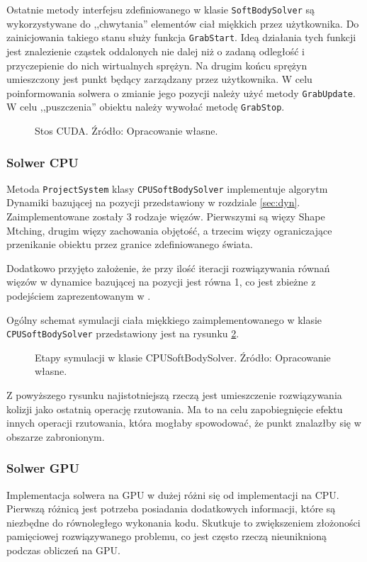 {Ostatnie metody interfejsu zdefiniowanego w klasie \texttt{SoftBodySolver}
są wykorzystywane do ,,chwytania'' elementów ciał miękkich przez użytkownika. Do
zainicjowania takiego stanu służy funkcja \texttt{GrabStart}. Ideą działania
tych funkcji jest znalezienie cząstek oddalonych nie dalej niż o zadaną
odległość i przyczepienie do nich wirtualnych sprężyn. Na drugim końcu sprężyn
umieszczony jest punkt będący zarządzany przez użytkownika. W celu
poinformowania solwera o zmianie jego pozycji należy użyć metody
\texttt{GrabUpdate}. W celu ,,puszczenia'' obiektu należy wywołać metodę
\texttt{GrabStop}.


\begin{figure}[H]
\centering

\caption{Stos CUDA. Źródło: Opracowanie własne.}
\label{class-hierarchy}
\end{figure}

\subsubsection{Solwer CPU}
Metoda \texttt{ProjectSystem} klasy \texttt{CPUSoftBodySolver}
implementuje algorytm Dynamiki bazującej na pozycji przedstawiony w rozdziale
\ref{sec:dyn}. Zaimplementowane zostały 3 rodzaje więzów. Pierwszymi są więzy Shape
Mtching, drugim więzy zachowania objętość, a trzecim więzy ograniczające
przenikanie obiektu przez granice zdefiniowanego świata.

Dodatkowo przyjęto założenie, że przy ilość iteracji rozwiązywania równań więzów
w dynamice bazującej na pozycji jest równa 1, co jest zbieżne z podejściem
zaprezentowanym w \cite{diziol}.

Ogólny schemat symulacji ciała miękkiego zaimplementowanego w klasie
\texttt{CPUSoftBodySolver} przedstawiony jest na rysunku \ref{flow-cpu}.

\begin{figure}[H]
\centering

\caption{Etapy symulacji w klasie CPUSoftBodySolver. Źródło: Opracowanie własne.}
\label{flow-cpu}
\end{figure}

Z powyższego rysunku najistotniejszą rzeczą jest umieszczenie rozwiązywania
kolizji jako ostatnią operację rzutowania. Ma to na celu zapobiegnięcie efektu
innych operacji rzutowania, która mogłaby spowodować, że punkt znalazłby się w
obszarze zabronionym.

\subsubsection{Solwer GPU}
Implementacja solwera na GPU w dużej różni się od implementacji na CPU.
Pierwszą różnicą jest potrzeba posiadania dodatkowych informacji, które są
niezbędne do równoległego wykonania kodu. Skutkuje to zwiększeniem złożoności
pamięciowej rozwiązywanego problemu, co jest często rzeczą nieuniknioną podczas
obliczeń na GPU.

}
